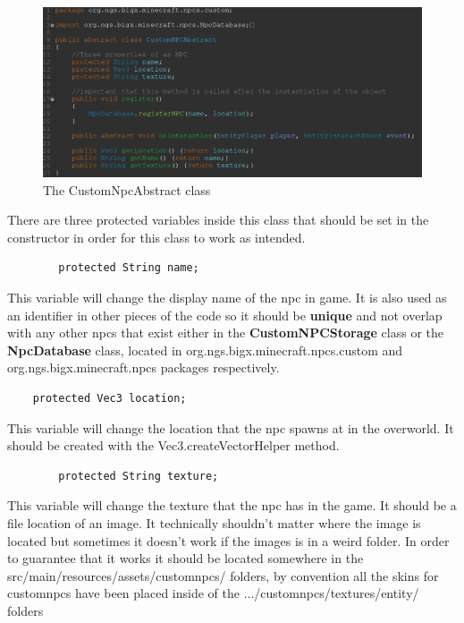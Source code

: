 \documentclass[12pt]{article}
\begin{document}
\begin{figure}[H]
	\caption{The CustomNpcAbstract class}
	\includegraphics[scale=0.5]{images/npcs/CustomNpcAbstract.png}
	\centering
\end{figure}

There are three protected variables inside this class that should be set in the constructor in order for this class to work as intended. 

\begin{verbatim}
		protected String name;
\end{verbatim}

This variable will change the display name of the npc in game. It is also used as an identifier in other pieces of the code so it should be {\bfseries unique} and not overlap with any other npcs that exist either in the {\bfseries CustomNPCStorage} class or the {\bfseries NpcDatabase} class, located in org.ngs.bigx.minecraft.npcs.custom and org.ngs.bigx.minecraft.npcs packages respectively.

\begin{verbatim}
	protected Vec3 location;	
\end{verbatim}

This variable will change the location that the npc spawns at in the overworld. It should be created with the Vec3.createVectorHelper method.

\begin{verbatim}
		protected String texture;
\end{verbatim}

This variable will change the texture that the npc has in the game. It should be a file location of an image. It technically shouldn't matter where the image is located but sometimes it doesn't work if the images is in a weird folder. In order to guarantee that it works it should be located somewhere in the src/main/resources/assets/customnpcs/ folders, by convention all the skins for customnpcs have been placed inside of the .../customnpcs/textures/entity/ folders
\end{document}
